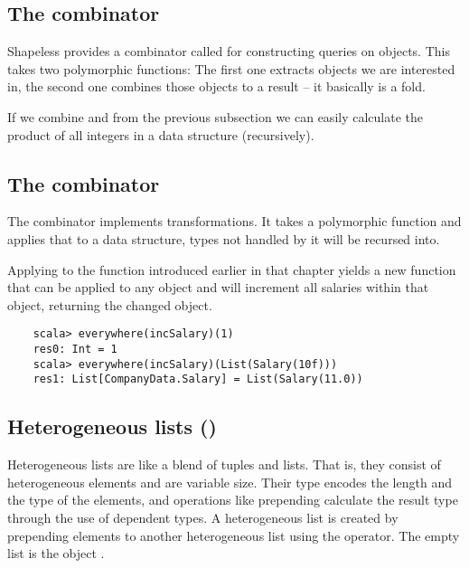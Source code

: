 \subsection{The  combinator}
Shapeless provides a combinator called  for constructing
queries on objects. This takes two polymorphic functions: The first one
extracts objects we are interested in, the second one combines those objects
to a result -- it basically is a fold.

\begin{example}
  If we combine  and  from the previous subsection we can
  easily calculate the product of all integers in a data structure (recursively).
  
\end{example}

\subsection{The  combinator}
The  combinator implements transformations. It takes a
polymorphic function and applies that to a data structure, types
not handled by it will be recursed into.

\begin{example}
  Applying  to the function  introduced earlier
  in that chapter yields a new function that can be applied to any object
  and will increment all salaries within that object, returning the changed
  object.

  \begin{lstlisting}
    scala> everywhere(incSalary)(1)
    res0: Int = 1
    scala> everywhere(incSalary)(List(Salary(10f)))
    res1: List[CompanyData.Salary] = List(Salary(11.0))
  \end{lstlisting}
\end{example}

\subsection{Heterogeneous lists ()}
Heterogeneous lists are like a blend of tuples and lists. That is, they
consist of heterogeneous elements and are variable size. Their type encodes
the length and the type of the elements, and operations like prepending calculate
the result type through the use of dependent types.
A heterogeneous list is created by prepending elements to another heterogeneous
list using the \cd{::} operator. The empty list is the object .

